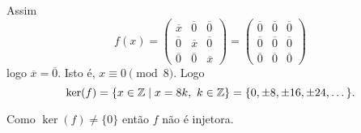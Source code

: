 \documentclass[12pt]{article}
\begin{document}
Assim
\[
	f(x) = \begin{pmatrix}
		\overline{x} & \overline{0} & \overline{0}\\
		\overline{0} & \overline{x} & \overline{0}\\
		\overline{0} & \overline{0} & \overline{x}
	\end{pmatrix} = \begin{pmatrix}
		\overline{0} & \overline{0} & \overline{0}\\
		\overline{0} & \overline{0} & \overline{0}\\
		\overline{0} & \overline{0} & \overline{0}
	\end{pmatrix}
\]
logo $\overline{x} = \overline{0}$. Isto é, $x \equiv 0 \pmod 8$. Logo 
\[
	\ker(f) = \{x \in \mathbb{Z} \mid x = 8k,\ k \in \mathbb{Z}\} = \{0, \pm 8, \pm 16, \pm 24, \dots\}.
\]

Como $\ker(f) \ne \{0\}$ então $f$ não é injetora.
\end{document}
